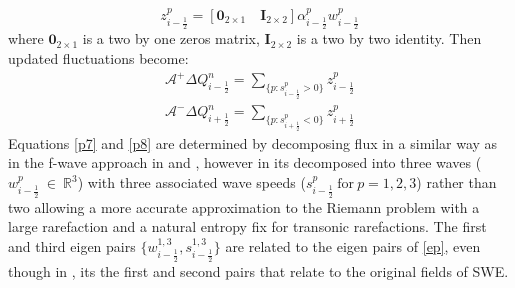 \documentclass[12pt,a4paper]{article}
\begin{document}
	\begin{equation}
		z_{i-\frac{1}{2}}^{p} = [\mathbf{0}_{2\times1} \quad \mathbf{I}_{2\times2}] \alpha_{i-\frac{1}{2}}^{p} w_{i-\frac{1}{2}}^{p}
	\end{equation}
	where $\mathbf{0}_{2\times1}$ is a two by one zeros matrix, $\mathbf{I}_{2\times2}$ is a two by two identity. Then updated fluctuations become:
	\begin{eqnarray}
		\mathcal{A^{+}}\Delta Q_{i-\frac{1}{2}}^{n} = \sum_{\{ p:s_{i-\frac{1}{2}}^{p}>0\}}  z_{i-\frac{1}{2}}^{p}
		\label{p7}\\
		\mathcal{A^{-}}\Delta Q_{i+\frac{1}{2}}^{n} = \sum_{\{ p:s_{i+\frac{1}{2}}^{p}<0\}} z_{i+\frac{1}{2}}^{p}
		\label{p8}
	\end{eqnarray}
	Equations \ref{p7} and \ref{p8} are determined by decomposing flux in a similar way as in the f-wave approach in \cite{ba-le-mi-ro:2003} and \cite{george2006finite}, however in  \cite{ge:2008}  its decomposed into three waves ($w^{p}_{i-\frac{1}{2}} ~\in ~\mathbb{R}^{3}$)  with three associated wave speeds ($s^{p}_{i-\frac{1}{2}} ~\text{for}~ p =1,2,3$)  rather than two  allowing a more accurate approximation to the Riemann problem with a large rarefaction and a natural entropy fix for transonic rarefactions. The first and third eigen pairs $\{w^{1,3}_{i-\frac{1}{2}},s^{1,3}_{i-\frac{1}{2}}\}  $    are related to the eigen pairs of \eqref{ep}, even though in  \cite{be-ge-le-ma:2011}, its the first and second pairs that relate to the original fields of SWE. \\
	
\end{document}
